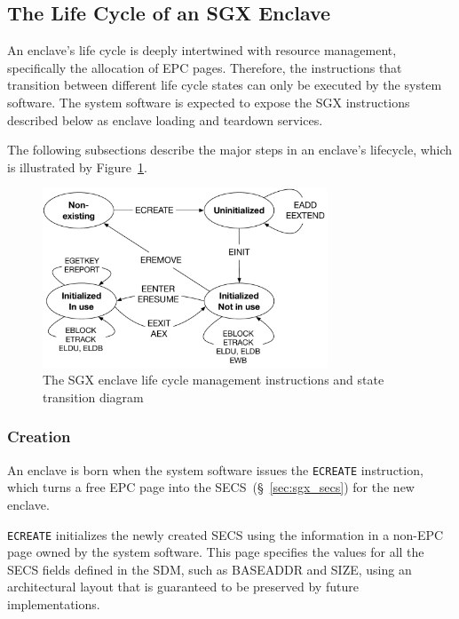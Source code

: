 \subsection{The Life Cycle of an SGX Enclave}
\label{sec:sgx_enclave_lifecycle}

An enclave's life cycle is deeply intertwined with resource management,
specifically the allocation of EPC pages. Therefore, the instructions that
transition between different life cycle states can only be executed by the
system software. The system software is expected to expose the SGX instructions
described below as enclave loading and teardown services.

The following subsections describe the major steps in an enclave's lifecycle,
which is illustrated by Figure~\ref{fig:sgx_enclave_lifecycle}.

\begin{figure}[hbt]
  \centering
  \includegraphics[width=85mm]{figures/sgx_enclave_lifecycle.pdf}
  \caption{
    The SGX enclave life cycle management instructions and state transition
    diagram
  }
  \label{fig:sgx_enclave_lifecycle}
\end{figure}



\subsubsection{Creation}
\label{sec:sgx_ecreate}

An enclave is born when the system software issues the \texttt{ECREATE}
instruction, which turns a free EPC page into the SECS~(\S~\ref{sec:sgx_secs})
for the new enclave.

\texttt{ECREATE} initializes the newly created SECS using the information in a
non-EPC page owned by the system software. This page specifies the values for
all the SECS fields defined in the SDM, such as BASEADDR and SIZE, using an
architectural layout that is guaranteed to be preserved by future
implementations.

